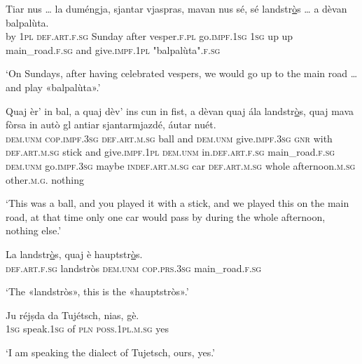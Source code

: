 \begin{linenumbers}
\gll    Tiar nus … la duméngja, sjantar vjaspras, mavan nus sé, sé  landstr\underline{ò}s … a dèvan balpalùta.\\
by \textsc{1pl} {} \textsc{def.art.f.sg} Sunday  after vesper.\textsc{f.pl} go.\textsc{impf.1sg} \textsc{1sg} up up main\_road.\textsc{f.sg} {} and give.\textsc{impf.1pl} "balpalùta".\textsc{f.sg}\\
\end{linenumbers}
\medskip
\glt `On Sundays, after having celebrated vespers, we would go up to the main road … and play «balpalùta».'
\medskip

\begin{linenumbers}
\gll    Quaj èr’ in bal, a quaj dèv’ ins cun in fist, a dèvan quaj ála  landstr\underline{ò}s, quaj mava fòrsa in autò gl antiar sjantarmjazdé, áutar nuét.\\
 \textsc{dem.unm} \textsc{cop.impf.3sg} \textsc{def.art.m.sg} ball and \textsc{dem.unm} give.\textsc{impf.3sg} \textsc{gnr} with \textsc{def.art.m.sg} stick and give.\textsc{impf.1pl} \textsc{dem.unm} in.\textsc{def.art.f.sg} main\_road.\textsc{f.sg}  \textsc{dem.unm} go.\textsc{impf.3sg} maybe \textsc{indef.art.m.sg} car \textsc{def.art.m.sg} whole afternoon.\textsc{m.sg} other.\textsc{m.g.} nothing\\
\end{linenumbers}
\medskip
\glt `This was a ball, and you played it with a stick, and we played this on the main road, at that time only one car would pass by during the whole afternoon, nothing else.'
\medskip


\begin{linenumbers}
\gll La landstr\underline{ò}s, quaj è hauptstr\underline{ò}s.\footnotemark\\
 \textsc{def.art.f.sg} landstròs \textsc{dem.unm} \textsc{cop.prs.3sg} main\_road.\textsc{f.sg}\\
\end{linenumbers}
\medskip
\glt `The «landstròs», this is the «hauptstròs».'
\medskip

\begin{linenumbers}
\gll   Ju réjṣda da Tujétsch, nias, gè. \\
\textsc{1sg} speak.\textsc{1sg} of \textsc{pln} \textsc{poss.1pl.m.sg} yes  \\
\end{linenumbers}
\medskip
\glt `I am speaking the dialect of Tujetsch, ours, yes.'
\medskip

